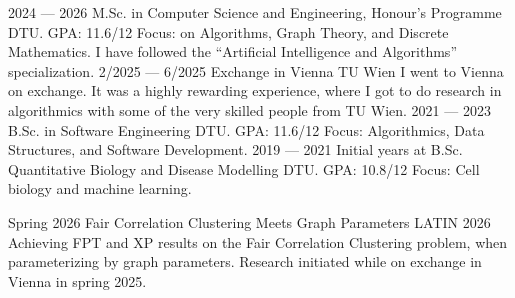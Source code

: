 \documentclass[9pt]{developercv} %
\begin{document}






\begin{entrylist}
	\entry%
		{2024 --- 2026}
		{M.Sc. in Computer Science and Engineering, Honour's Programme}
		{DTU. GPA: 11.6/12}
		{Focus: on Algorithms, Graph Theory, and Discrete Mathematics. I have followed the ``Artificial Intelligence and Algorithms'' specialization.}
	\entry%
		{2/2025 --- 6/2025}
		{Exchange in Vienna}
		{TU Wien}
		{I went to Vienna on exchange. It was a highly rewarding experience, where I got to do research in algorithmics with some of the very skilled people from TU Wien. }
	\entry%
		{2021 --- 2023}
		{B.Sc. in Software Engineering}
		{DTU. GPA: 11.6/12}
		{Focus: Algorithmics, Data Structures, and Software Development.}
	\entry%
		{2019 --- 2021}
		{Initial years at B.Sc. Quantitative Biology and Disease Modelling}
		{DTU. GPA: 10.8/12}
		{Focus: Cell biology and machine learning.}
\end{entrylist}



\begin{entrylist}
	\entry%
		{Spring 2026}
		{Fair Correlation Clustering Meets Graph Parameters}
		{LATIN 2026}
		{Achieving FPT and XP results on the Fair Correlation Clustering problem, when parameterizing by graph parameters. Research initiated while on exchange in Vienna in spring 2025.}
\end{entrylist}
\end{document}
